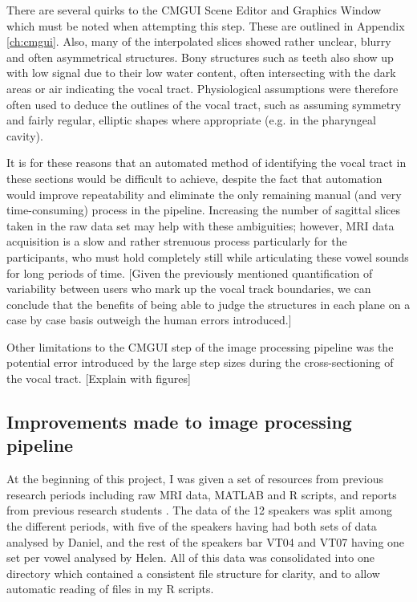 There are several quirks to the CMGUI Scene Editor and Graphics Window which must be noted when attempting this step. These are outlined in Appendix \ref{ch:cmgui}. Also, many of the interpolated slices showed rather unclear, blurry and often asymmetrical structures. Bony structures such as teeth also show up with low signal due to their low water content, often intersecting with the dark areas or air indicating the vocal tract. Physiological assumptions were therefore often used to deduce the outlines of the vocal tract, such as assuming symmetry and fairly regular, elliptic shapes where appropriate (e.g. in the pharyngeal cavity).

It is for these reasons that an automated method of identifying the vocal tract in these sections would be difficult to achieve, despite the fact that automation would improve repeatability and eliminate the only remaining manual (and very time-consuming) process in the pipeline. Increasing the number of sagittal slices taken in the raw data set may help with these ambiguities; however, MRI data acquisition is a slow and rather strenuous process particularly for the participants, who must hold completely still while articulating these vowel sounds for long periods of time. [Given the previously mentioned quantification of variability between users who mark up the vocal track boundaries, we can conclude that the benefits of being able to judge the structures in each plane on a case by case basis outweigh the human errors introduced.]

Other limitations to the CMGUI step of the image processing pipeline was the potential error introduced by the large step sizes during the cross-sectioning of the vocal tract. [Explain with figures]

\subsection{Improvements made to image processing pipeline}

At the beginning of this project, I was given a set of resources from previous research periods including raw MRI data, MATLAB and R scripts, and reports from previous research students \cite{helen, daniel, kalyan}. The data of the 12 speakers was split among the different periods, with five of the speakers having had both sets of data analysed by Daniel, and the rest of the speakers bar VT04 and VT07 having one set per vowel analysed by Helen. All of this data was consolidated into one directory which contained a consistent file structure for clarity, and to allow automatic reading of files in my R scripts.

